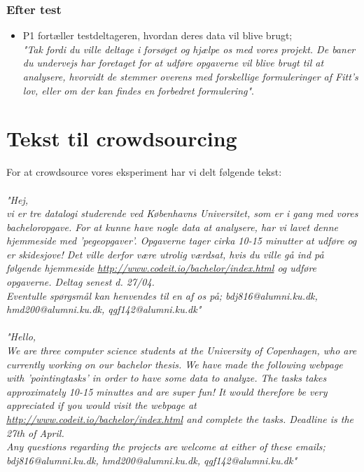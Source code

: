 \begin{appendices}
\subsection*{Efter test}
\begin{itemize}
\item{P1 fortæller testdeltageren, hvordan  deres data vil blive brugt;
\\\textit{"Tak fordi du ville deltage i forsøget og hjælpe os med vores projekt. De baner du undervejs har foretaget for at udføre opgaverne vil blive brugt til at analysere, hvorvidt de stemmer overens med forskellige formuleringer af Fitt's lov, eller om der kan findes en forbedret formulering"}.}
\end{itemize}

\chapter{Tekst til crowdsourcing}
For at crowdsource vores eksperiment har vi delt følgende tekst:
\\\\\textit{"Hej,\\ vi er tre datalogi studerende ved Københavns Universitet, som er i gang med vores bacheloropgave. For at kunne have nogle data at analysere, har vi lavet denne hjemmeside med 'pegeopgaver'. Opgaverne tager cirka 10-15 minutter at udføre og er skidesjove! Det ville derfor være utrolig værdsat, hvis du ville gå ind på følgende hjemmeside \url{http://www.codeit.io/bachelor/index.html} og udføre opgaverne. Deltag senest d. 27/04.
\\Eventulle spørgsmål kan henvendes til en af os på; bdj816@alumni.ku.dk, hmd200@alumni.ku.dk, qgf142@alumni.ku.dk"}
\\\\\textit{"Hello,\\ We are three computer science students at the University of Copenhagen, who are currently working on our bachelor thesis. We have made the following webpage with 'pointingtasks' in order to have some data to analyze. The tasks takes approximately 10-15 minuttes and are super fun! It would therefore be very appreciated if you would visit the webpage at \url{http://www.codeit.io/bachelor/index.html} and complete the tasks. Deadline is the 27th of April.
\\Any questions regarding the projects are welcome at either of these emails; bdj816@alumni.ku.dk, hmd200@alumni.ku.dk, qgf142@alumni.ku.dk"}


\end{appendices}
